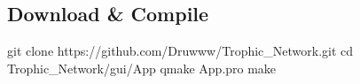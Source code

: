 \subsection*{Download \& Compile}


\begin{DoxyCode}
git clone https://github.com/Druwww/Trophic\_Network.git
cd Trophic\_Network/gui/App
qmake App.pro
make
\end{DoxyCode}
 